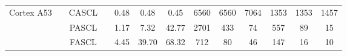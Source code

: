 \documentclass[11pt]{report}
\begin{document}
\begin{table}[h]
{{\begin{tabular}{r|c|c|c c c c| c c c| c c c}
        \hline
        \multirow{3}{*}{\begin{minipage}{0.5in}\centering Cortex A53\end{minipage}}  & \multirow{3}{*}{\begin{minipage}{0.5in}\centering 1840\end{minipage}}
                                                                                     & CASCL                                                                                 &                                            & 0.48 & 0.48                                                      & 0.45                                              & 6560                                                       & 6560         & 7064         & 1353         & 1353         & 1457                        \\
                                                                                     &                                                                                       & PASCL                                      &      & 1.17                                                      & 7.32                                              & 42.77                                                      & 2701         & 433          & 74           & 557          & 89           & 15           \\
                                                                                     &                                                                                       & FASCL                                      &      & 4.45                                                      & 39.70                                             & 68.32                                                      & 712          & 80           & 46           & 147          & 16           & 10           \\


\end{tabular}}}
\end{table}
\end{document}
